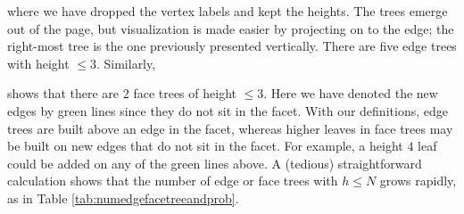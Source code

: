 \documentclass[aps,prl,twocolumn, superscriptaddress,groupedaddress,nofootinbib]{revtex4-1}
\begin{document}
where we have dropped the vertex labels and kept the heights.
The trees emerge out of the page, but visualization is made easier
by projecting on to the edge; the right-most tree is the
one previously presented vertically. There are five
edge trees with height $\leq 3$. Similarly,
\begin{center}
\end{center}
shows that there are $2$ face trees of height $\leq 3$. Here we have denoted the new edges by green lines since they do
not sit in the facet. With our definitions, edge trees are built above an edge
in the facet, whereas higher leaves in face trees may be built on new edges
that do not sit in the facet. For example, a height $4$ leaf could be added
on any of the green lines above. A (tedious) straightforward calculation shows that the number of
edge or face trees with $h \leq N$ grows rapidly, as in
Table \ref{tab:numedgefacetreeandprob}.%
\end{document}
